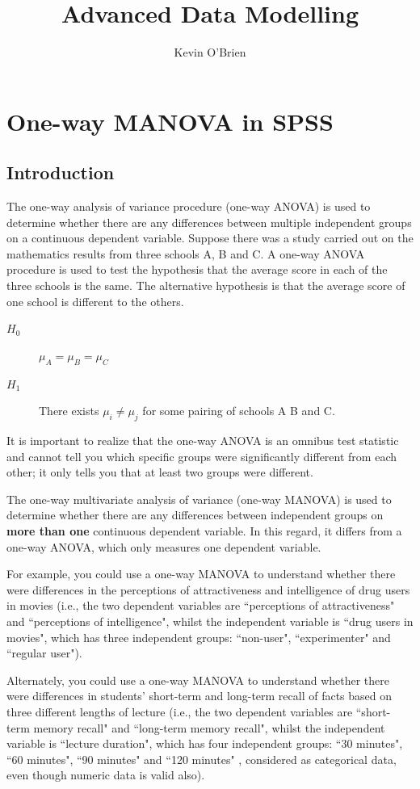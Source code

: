 \documentclass[12pt]{article} %
\title{Advanced Data Modelling}
\author{Kevin O'Brien}
\begin{document}
\maketitle

\newpage


\section{One-way MANOVA in SPSS}

\subsection{Introduction}
The one-way analysis of variance procedure (one-way ANOVA) is used to determine whether there are any differences between multiple independent groups on a continuous dependent variable. Suppose there was a study carried out on the mathematics results from three schools A, B and C. A one-way ANOVA procedure is used to test the hypothesis that the average score in each of the three schools is the same.
The alternative hypothesis is that the average score of one school is different to the others.
\begin{description}
\item[$H_0$] $\mu_A = \mu_B = \mu_C$
\item[$H_1$] There exists $\mu_i \neq \mu_j$ for some pairing of schools A B and C.
\end{description}
It is important to realize that the one-way ANOVA is an omnibus test statistic and cannot tell you which specific groups were significantly different from each other; it only tells you that at least two groups were different.

The one-way multivariate analysis of variance (one-way MANOVA) is used to determine whether there are any differences between independent groups on \textbf{more than one} continuous dependent variable. In this regard, it differs from a one-way ANOVA, which only measures one dependent variable.


For example, you could use a one-way MANOVA to understand whether there were differences in the perceptions of attractiveness and intelligence of drug users in movies (i.e., the two dependent variables are ``perceptions of attractiveness" and ``perceptions of intelligence", whilst the independent variable is ``drug users in movies", which has three independent groups: ``non-user", ``experimenter" and ``regular user").


Alternately, you could use a one-way MANOVA to understand whether there were differences in students' short-term and long-term recall of facts based on three different lengths of lecture (i.e., the two dependent variables are ``short-term memory recall" and ``long-term memory recall", whilst the independent variable is ``lecture duration", which has four independent groups: ``30 minutes", ``60 minutes", ``90 minutes" and ``120 minutes" , considered as categorical data, even though numeric data is valid also).
\end{document}
